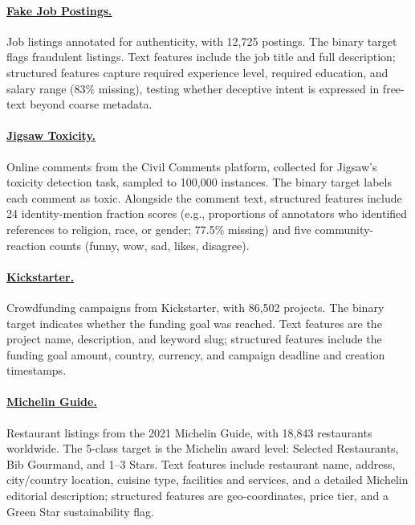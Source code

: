 \documentclass{llmxive}
\begin{document}
\paragraph{\href{https://www.openml.org/search?type=data&id=46655}{Fake Job Postings.}} Job listings annotated for authenticity, with 12,725 postings.
The binary target flags fraudulent listings.
Text features include the job title and full description; structured features capture required experience level, required education, and salary range (83\% missing), testing whether deceptive intent is expressed in free-text beyond coarse metadata.

\paragraph{\href{https://www.openml.org/search?type=data&id=46654}{Jigsaw Toxicity.}} Online comments from the Civil Comments platform, collected for Jigsaw's toxicity detection task, sampled to 100,000 instances.
The binary target labels each comment as toxic.
Alongside the comment text, structured features include 24 identity-mention fraction scores (e.g., proportions of annotators who identified references to religion, race, or gender; 77.5\% missing) and five community-reaction counts (funny, wow, sad, likes, disagree).

\paragraph{\href{https://www.openml.org/search?type=data&id=46668}{Kickstarter.}} Crowdfunding campaigns from Kickstarter, with 86,502 projects.
The binary target indicates whether the funding goal was reached.
Text features are the project name, description, and keyword slug; structured features include the funding goal amount, country, currency, and campaign deadline and creation timestamps.

\paragraph{\href{https://www.kaggle.com/datasets/ngshiheng/michelin-guide-restaurants-2021}{Michelin Guide.}} Restaurant listings from the 2021 Michelin Guide, with 18,843 restaurants worldwide.
The 5-class target is the Michelin award level: Selected Restaurants, Bib Gourmand, and 1--3 Stars.
Text features include restaurant name, address, city/country location, cuisine type, facilities and services, and a detailed Michelin editorial description; structured features are geo-coordinates, price tier, and a Green Star sustainability flag.
\end{document}
